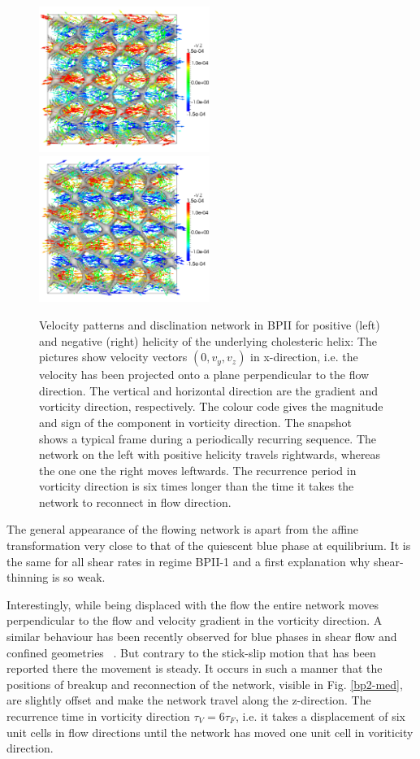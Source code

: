 \documentclass[aps,pre,reprint,superscriptaddress, twocolumn]{revtex4}
\begin{document}
\begin{figure}[htpb]
\includegraphics[width=0.495\textwidth]{v_yz-v_z-160k_run902.png}
\includegraphics[width=0.495\textwidth]{v_yz-v_z-160k_run903.png}
\caption{Velocity patterns and disclination network in BPII for positive (left) and negative (right) helicity of the 
underlying cholesteric helix: The pictures show velocity vectors $(0,v_y,v_z)$ in x-direction, 
i.e. the velocity has been projected onto a plane perpendicular to the flow direction. 
The vertical and horizontal direction are the gradient and vorticity direction, respectively.
The colour code gives the magnitude and sign of the component in vorticity direction.
The snapshot shows a typical frame during a periodically recurring sequence.
The network on the left with positive helicity travels rightwards, whereas the one one the right
moves leftwards. The recurrence period in vorticity direction is six times longer than the time it takes the network to reconnect in flow direction.}
\label{bp2-velo}
\end{figure}

The general appearance of the flowing network is apart from the affine transformation 
very close to that of the quiescent blue phase at equilibrium. It is the same for 
all shear rates in regime BPII-1 and a first explanation why shear-thinning is so weak.

Interestingly, while being displaced with the flow the entire network moves perpendicular 
to the flow and velocity gradient in the vorticity direction.
A similar behaviour has been recently observed for blue phases in shear flow and 
confined geometries ~\cite{Henrich:2012b}.
But contrary to the stick-slip motion that has been reported there the movement is 
steady. It occurs in such a manner that the positions of breakup and reconnection 
of the network, visible in Fig. \ref{bp2-med}, are slightly offset and make the network 
travel along the z-direction.
The recurrence time in vorticity direction $\tau_V=6\tau_F$, 
i.e. it takes a displacement of six unit cells in flow directions 
until the network has moved one unit cell in voriticity direction.
\end{document}
